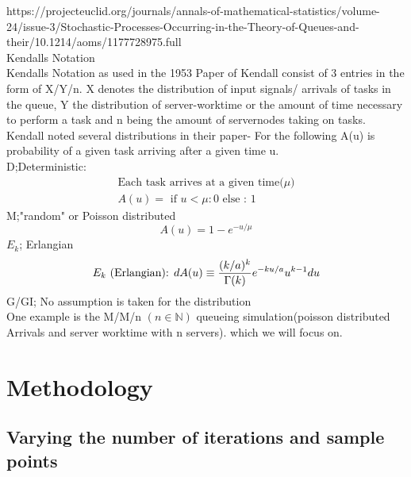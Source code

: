\documentclass{uva-inf-article}
\begin{document}
    https://projecteuclid.org/journals/annals-of-mathematical-statistics/volume-24/issue-3/Stochastic-Processes-Occurring-in-the-Theory-of-Queues-and-their/10.1214/aoms/1177728975.full\\


    Kendalls Notation\\
    Kendalls Notation as used in the 1953 Paper of Kendall consist of 3 entries in the form of X/Y/n.
    X denotes the distribution of input signals/ arrivals of tasks in the queue, Y the distribution of 
    server-worktime or the amount of time necessary to perform a task and n being the amount of servernodes 
    taking on tasks.
    Kendall noted several distributions in their paper-
    For the following A(u) is probability of a given task arriving after a given time u.\\
    D;Deterministic:
\begin{equation}\label{eq:determ}
	\begin{split}
		\text {Each task arrives at a given time($\mu$)}\\
        A(u) = \text { if  }u<\mu : 0 \text{ else : } 1
    \end{split}
	\end{equation}
    M;"random" or Poisson distributed
    \begin{equation}\label{eq:poisson}
    A(u) = 1-e^{-u/\mu}
	\end{equation}
    $E_k$; Erlangian
    \begin{equation}\label{eq:erlang}
        E_k \text { (Erlangian): } d A(u) \equiv \frac{(k / a)^k}{\Gamma(k)} e^{-k u / a} u^{k-1} d u\\
	\end{equation}
    G/GI; No assumption is taken for the distribution\\
    
    One example is the M/M/n $(n \in \mathbb{N})$ queueing simulation(poisson distributed Arrivals and server worktime with n servers). 
    which we will focus on.
    
  
\section{Methodology}

\subsection{Varying the number of iterations and sample points}
\end{document}
